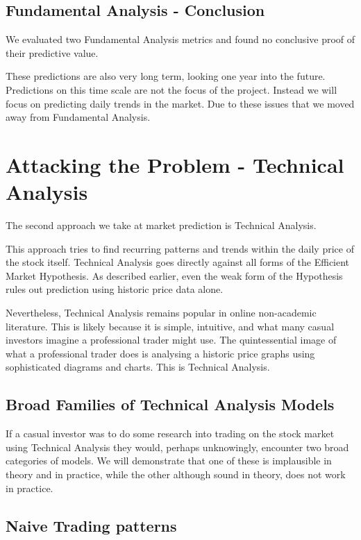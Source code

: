 \documentclass{report}
\begin{document}
\section{Fundamental Analysis - Conclusion}

We evaluated two Fundamental Analysis metrics and found no conclusive proof of their predictive value.  

These predictions are also very long term, looking one year into the future. Predictions on this time scale are not the focus of the project. Instead we will focus on predicting daily trends in the market. Due to these issues that we moved away from Fundamental Analysis.

\chapter{Attacking the Problem - Technical Analysis}

The second approach we take at market prediction is Technical Analysis. 

This approach tries to find recurring patterns and trends within the daily price of the stock itself. Technical Analysis goes directly against all forms of the Efficient Market Hypothesis. As described earlier, even the weak form of the Hypothesis rules out prediction using historic price data alone. 

Nevertheless, Technical Analysis remains popular in online non-academic literature. This is likely because it is simple, intuitive, and what many casual investors imagine a professional trader might use. The quintessential image of what a professional trader does is analysing a historic price graphs using sophisticated diagrams and charts. This is Technical Analysis.

\section{Broad Families of Technical Analysis Models}

If a casual investor was to do some research into trading on the stock market using Technical Analysis they would, perhaps unknowingly, encounter two broad categories of models. We will demonstrate that one of these is implausible in theory and in practice, while the other although sound in theory, does not work in practice.

\section{Naive Trading patterns}
\end{document}

